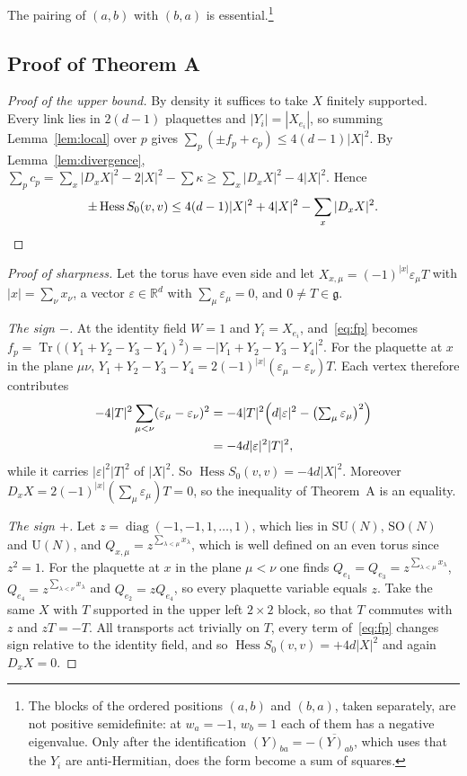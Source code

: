 \documentclass[aps,prd,twocolumn,superscriptaddress,nofootinbib,longbibliography,floatfix,amsmath,amssymb,10pt]{revtex4-2}
\theoremstyle{definition}
\theoremstyle{remark}
\newcommand{\R}{\mathbb{R}}
\newcommand{\SU}{\mathrm{SU}}
\newcommand{\SO}{\mathrm{SO}}
\newcommand{\U}{\mathrm{U}}
\newcommand{\g}{\mathfrak{g}}
\newcommand{\Tr}{\operatorname{Tr}}
\newcommand{\Hess}{\operatorname{Hess}}
\begin{document}
The pairing of $(a,b)$ with $(b,a)$ is essential.\footnote{The blocks of the
ordered positions $(a,b)$ and $(b,a)$, taken separately, are not positive
semidefinite: at $w_a=-1$, $w_b=1$ each of them has a negative eigenvalue.
Only after the identification $(Y)_{ba}=-\overline{(Y)_{ab}}$, which uses
that the $Y_i$ are anti-Hermitian, does the form become a sum of squares.}

\subsection{Proof of Theorem A}

\begin{proof}[Proof of the upper bound]
By density it suffices to take $X$ finitely supported. Every link lies in
$2(d-1)$ plaquettes and $|Y_i|=|X_{e_i}|$, so summing Lemma~\ref{lem:local}
over $p$ gives $\sum_p(\pm f_p+c_p)\le4(d-1)|X|^2$. By
Lemma~\ref{lem:divergence},
$\sum_pc_p=\sum_x|D_xX|^2-2|X|^2-\sum\kappa\ge\sum_x|D_xX|^2-4|X|^2$. Hence
\[
\pm\Hess S_0(v,v)\le4(d-1)|X|^2+4|X|^2-\sum_x|D_xX|^2. \qedhere
\]
\end{proof}

\begin{proof}[Proof of sharpness]
Let the torus have even side and let $X_{x,\mu}=(-1)^{|x|}\varepsilon_\mu T$
with $|x|=\sum_\nu x_\nu$, a vector $\varepsilon\in\R^d$ with
$\sum_\mu\varepsilon_\mu=0$, and $0\ne T\in\g$.

\emph{The sign $-$.} At the identity field $W=1$ and $Y_i=X_{e_i}$,
and~\eqref{eq:fp} becomes $f_p=\Tr\bigl((Y_1+Y_2-Y_3-Y_4)^2\bigr)
=-|Y_1+Y_2-Y_3-Y_4|^2$. For the plaquette at $x$ in the plane $\mu\nu$,
$Y_1+Y_2-Y_3-Y_4=2(-1)^{|x|}(\varepsilon_\mu-\varepsilon_\nu)T$. Each vertex
therefore contributes
\[
\begin{aligned}
-4|T|^2\sum_{\mu<\nu}(\varepsilon_\mu-\varepsilon_\nu)^2
&=-4|T|^2\Bigl(d|\varepsilon|^2-\bigl(\textstyle\sum_\mu\varepsilon_\mu
\bigr)^2\Bigr)\\
&=-4d|\varepsilon|^2|T|^2,
\end{aligned}
\]
while it carries $|\varepsilon|^2|T|^2$ of $|X|^2$. So
$\Hess S_0(v,v)=-4d|X|^2$. Moreover $D_xX=2(-1)^{|x|}(\sum_\mu
\varepsilon_\mu)T=0$, so the inequality of Theorem~A is an equality.

\emph{The sign $+$.} Let $z=\operatorname{diag}(-1,-1,1,\dots,1)$, which lies
in $\SU(N)$, $\SO(N)$ and $\U(N)$, and $Q_{x,\mu}=z^{\sum_{\lambda<\mu}
x_\lambda}$, which is well defined on an even torus since $z^2=1$. For the
plaquette at $x$ in the plane $\mu<\nu$ one finds $Q_{e_1}=Q_{e_3}=
z^{\sum_{\lambda<\mu}x_\lambda}$, $Q_{e_4}=z^{\sum_{\lambda<\nu}x_\lambda}$ and
$Q_{e_2}=zQ_{e_4}$, so every plaquette variable equals $z$. Take the same $X$
with $T$ supported in the upper left $2\times2$ block, so that $T$ commutes
with $z$ and $zT=-T$. All transports act trivially on $T$, every term
of~\eqref{eq:fp} changes sign relative to the identity field, and so
$\Hess S_0(v,v)=+4d|X|^2$ and again $D_xX=0$.
\end{proof}
\end{document}
